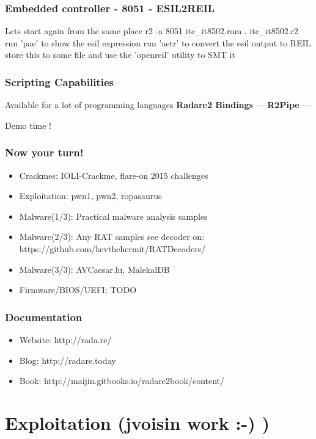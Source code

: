 \documentclass[10pt, compress]{beamer}
\begin{document}
\begin{frame}[fragile]
  \frametitle{Embedded controller - 8051 - ESIL2REIL}
  \center Lets start again from the same place
  \center r2 -a 8051 ite\_it8502.rom
  \center . ite\_it8502.r2
  \center run 'pae' to show the esil expression
  \center run 'aetr' to convert the esil output to REIL
  \center store this to some file and use the 'openreil' utility to SMT it
\end{frame}

\begin{frame}[fragile]
  \frametitle{Scripting Capabilities}
  \center Available for a lot of programming languages
  \center\textbf{Radare2 Bindings} —
  \center\textbf{R2Pipe} —
  \noindent\makebox[\linewidth]{\rule{\paperwidth}{0.4pt}}
  \item Demo time !
\end{frame}

\begin{frame}[fragile]
  \frametitle{Now your turn!}
    \begin{itemize}
    \item \alert{Crackmes:} IOLI-Crackme, flare-on 2015 challenges
    \item \alert{Exploitation:} pwn1, pwn2, ropasaurus
    \item \alert{Malware(1/3):} Practical malware analysis samples
    \item \alert{Malware(2/3):} Any RAT samples see decoder on: https://github.com/kevthehermit/RATDecoders/
    \item \alert{Malware(3/3):} AVCaesar.lu, MalekalDB
    \item \alert{Firmware/BIOS/UEFI:} TODO
    \end{itemize}
\end{frame}

\begin{frame}[fragile]
  \frametitle{Documentation}
    \begin{itemize}
    \item \alert{Website:} http://rada.re/
    \item \alert{Blog:} http://radare.today
    \item \alert{Book:} http://maijin.gitbooks.io/radare2book/content/
    \end{itemize}
\end{frame}

\section{Exploitation (jvoisin work :-) )}
\end{document}
